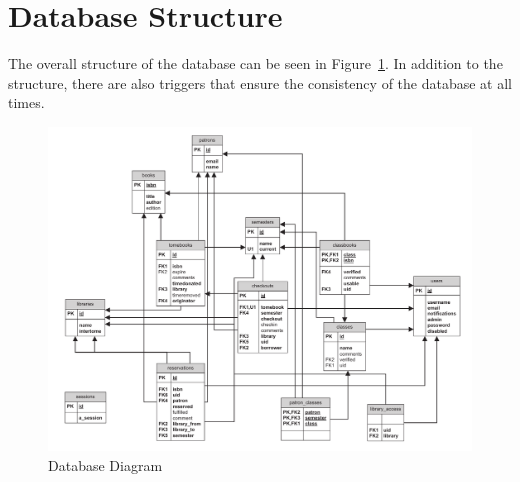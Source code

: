 \documentclass[12pt,titlepage]{article}
\begin{document}
\section{Database Structure}
The overall structure of the database can be seen in Figure~\ref{tomedb}.  In addition to the structure, there are also triggers that ensure the consistency of the database at all times.
\begin{figure}[h]
	\includegraphics[width=\textwidth]{tomedb}
	\caption{Database Diagram}
	\label{tomedb}
\end{figure}
\end{document}
